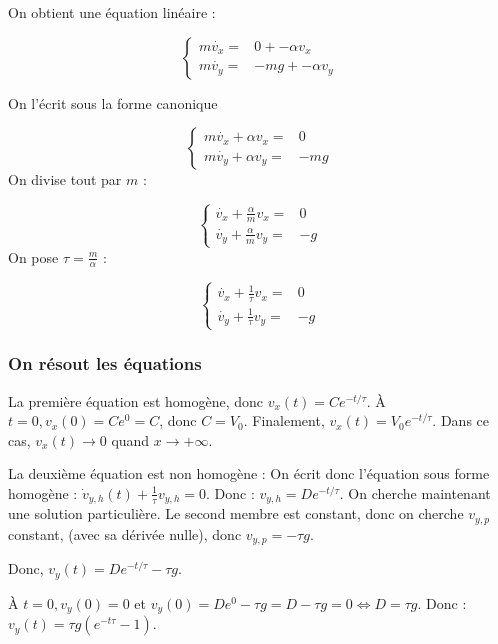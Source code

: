 \documentclass[french]{yLectureNote}
\begin{document}
\begin{multicols}{2}
On obtient une équation linéaire :

\[
 \left\{\begin{matrix}
 m\dot{v_x} =& 0 + -\alpha v_x\\
 m\dot{v_y} =& -mg + -\alpha v_y
\end{matrix}\right.
\]

On l'écrit sous la forme canonique

\[
 \left\{\begin{matrix}
 m\dot{v_x} + \alpha v_x =& 0\\
 m\dot{v_y} +\alpha v_y =& -mg
\end{matrix}\right.
\]
\setlength{\columnseprule}{0.4pt}
On divise tout par $m$ :

\[
 \left\{\begin{matrix}
\dot{v_x} +\frac{\alpha}{m} v_x =& 0\\
 \dot{v_y} +\frac{\alpha}{m} v_y =& -g
\end{matrix}\right.
\]
On pose $\tau  = \frac{m}{\alpha}$ :

\[\left\{\begin{matrix}
\dot{v_x} +\frac{1}{\tau} v_x =& 0\\
 \dot{v_y} +\frac{1}{\tau} v_y =& -g
\end{matrix}\right.
\]
\end{multicols}


\subsubsection{On résout les équations}
La première équation est homogène, donc $v_x(t) = Ce^{-t/\tau}$. À $t=0, v_x(0) = Ce^0 = C$, donc $C = V_0$. Finalement, $v_x(t) = V_0e^{-t/\tau}$. Dans ce cas, $v_x(t)\rightarrow 0$ quand $x\rightarrow+\infty$.

La deuxième équation est non homogène : On écrit donc l'équation sous forme homogène : $\dot{v}_{y,h}(t) + \frac{1}{\tau} v_{y,h} = 0$. Donc : $v_{y,h} = De^{-t/\tau}$. On cherche maintenant une solution particulière. Le second membre est constant, donc on cherche $v_{y,p}$ constant, (avec sa dérivée nulle), donc $v_{y,p} = -\tau g$.

Donc, $v_y(t) = De^{-t/\tau} - \tau g$.

À $t=0, v_y(0)=0$ et $v_y(0) = De^0-\tau g = D-\tau g = 0 \iff D = \tau g$. Donc : $v_y(t) = \tau g(e^{-t\tau}-1)$.
\end{document}
